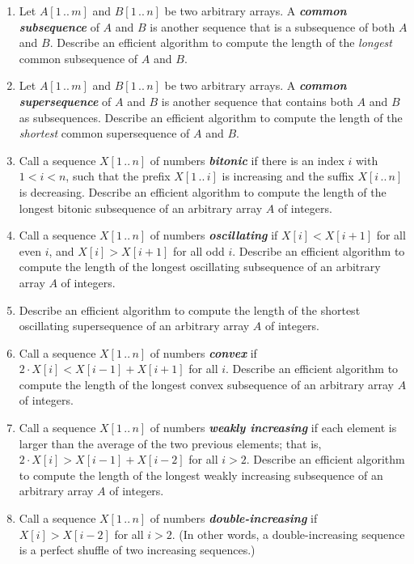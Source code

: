 \begin{enumerate}[label=\arabic*.,ref=\thechapter.\arabic*,leftmargin=*,align=left,widest*=99,itemsep=1.5ex plus 0.5ex]
\begin{enumerate}
\item Let $A[1\,..\,m]$ and $B[1\,..\,n]$ be two arbitrary arrays.
A \textbf{\textit{common subsequence}} of $A$ and $B$ is another sequence that is a subsequence of both $A$ and $B$.
Describe an efficient algorithm to compute the length of the \textit{longest} common subsequence of $A$ and $B$.
\item Let $A[1\,..\,m]$ and $B[1\,..\,n]$ be two arbitrary arrays.
A \textbf{\textit{common supersequence}} of $A$ and $B$ is another sequence that contains both $A$ and $B$ as subsequences.
Describe an efficient algorithm to compute the length of the \textit{shortest} common supersequence of $A$ and $B$.
\item Call a sequence $X[1\,..\,n]$ of numbers \textbf{\textit{bitonic}} if there is an index $i$ with $1 < i < n$, such that the prefix $X[1\,..\,i]$ is increasing and the suffix $X[i\,..\,n]$ is decreasing.
Describe an efficient algorithm to compute the length of the longest bitonic subsequence of an arbitrary array $A$ of integers.
\item Call a sequence $X[1\,..\,n]$ of numbers \textbf{\textit{oscillating}} if $X[i] < X[i+1]$ for all even $i$, and $X[i] > X[i+1]$ for all odd $i$.
Describe an efficient algorithm to compute the length of the longest oscillating subsequence of an arbitrary array $A$ of integers.
\item Describe an efficient algorithm to compute the length of the shortest oscillating supersequence of an arbitrary array $A$ of integers.
\item Call a sequence $X[1\,..\,n]$ of numbers \textbf{\textit{convex}} if $2 \cdot X[i] < X[i-1] + X[i+1]$ for all $i$.
Describe an efficient algorithm to compute the length of the longest convex subsequence of an arbitrary array $A$ of integers.
\item Call a sequence $X[1\,..\,n]$ of numbers \textbf{\textit{weakly increasing}} if each element is larger than the average of the two previous elements; that is, $2 \cdot X[i] > X[i-1] + X[i-2]$ for all $i > 2$.
Describe an efficient algorithm to compute the length of the longest weakly increasing subsequence of an arbitrary array $A$ of integers.
\item Call a sequence $X[1\,..\,n]$ of numbers \textbf{\textit{double-increasing}} if $X[i] > X[i-2]$ for all $i > 2$.
(In other words, a double-increasing sequence is a perfect shuffle of two increasing sequences.)

\end{enumerate}
\end{enumerate}
